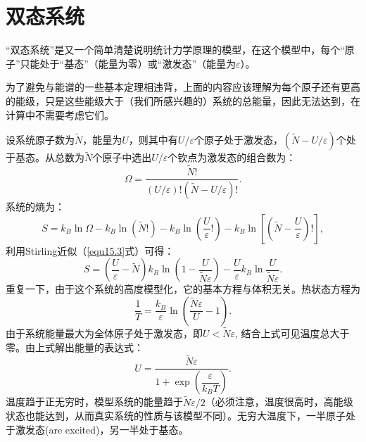 \section{双态系统}
\label{sec15.3}
“双态系统”是又一个简单清楚说明统计力学原理的模型，在这个模型中，每个“原子”只能处于“基态”（能量为零）或“激发态”（能量为$\varepsilon$）。

为了避免与能谱的一些基本定理相违背，上面的内容应该理解为每个原子还有更高的能级，只是这些能级大于（我们所感兴趣的）系统的总能量，因此无法达到，在计算中不需要考虑它们。

设系统原子数为$\tilde{N}$，能量为$U$，则其中有$U/\varepsilon$个原子处于激发态，$(\tilde{N} - U/\varepsilon)$个处于基态。从总数为$\tilde{N}$个原子中选出$U / \varepsilon$个钦点为激发态的组合数为：
\begin{equation}
	\Omega = \frac{ \tilde{N}! }{ (U / \varepsilon)! (\tilde{N} - U/\varepsilon)! }.
\label{equ15.8}
\end{equation}
系统的熵为：
\begin{equation}
	S = k_B \ln \Omega - k_B \ln (\tilde{N}!) - k_B \ln \left( \frac{U}{\varepsilon}! \right) - k_B \ln \left[ \left( \tilde{N} - \frac{U}{\varepsilon} \right)! \right],
\label{equ15.9}
\end{equation}
利用Stirling近似（\eqref{equ15.3}式）可得：
\begin{equation}
	S = \left( \frac{U}{\varepsilon} - \tilde{N} \right) k_B \ln \left( 1 - \frac{U}{\tilde{N} \varepsilon} \right) - \frac{U}{\varepsilon} k_B \ln \frac{U}{\tilde{N} \varepsilon}.
\label{equ15.10}
\end{equation}
重复一下，由于这个系统的高度模型化，它的基本方程与体积无关。热状态方程为
\begin{equation}
	\frac{1}{T} = \frac{k_B}{\varepsilon} \ln \left( \frac{\tilde{N} \varepsilon}{U} - 1 \right).
\label{equ15.11}
\end{equation}
由于系统能量最大为全体原子处于激发态，即$U < \tilde{N} \varepsilon$, 结合上式可见温度总大于零。由上式解出能量的表达式：
\begin{equation}
	U = \frac{\tilde{N} \varepsilon}{1 + \exp \left( \dfrac{\varepsilon}{k_B T} \right)}.
\label{equ15.12}
\end{equation}
温度趋于正无穷时，模型系统的能量趋于$\tilde{N} \varepsilon / 2$（必须注意，温度很高时，高能级状态也能达到，从而真实系统的性质与该模型不同）。无穷大温度下，一半原子处于激发态(are excited)，另一半处于基态。

